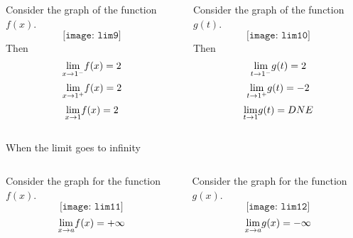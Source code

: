 \documentclass{beamer}
\begin{document}
\begin{frame}
\begin{columns}
	\begin{column}{0.48\textwidth}
		\begin{Example} Consider the graph of the function $f(x)$.
			$$
			\texttt{[image: lim9]}
			$$
			Then 
			$$
			\underset{x\rightarrow 1^-}{\rm lim}f(x)=2 $$
			$$	\underset{x\rightarrow 1^+}{\rm lim}f(x)= 2 $$ 	$$\underset{x\rightarrow 1}{\rm lim}f(x)=2
			$$
		\end{Example}
	\end{column}
	
	
	\begin{column}{0.48\textwidth}
		\begin{Example} Consider the graph of the function $g(t)$.
			$$
			\texttt{[image: lim10]}
			$$
			Then 
			$$
			\underset{t\rightarrow 1^-}{\rm lim}g(t)=2$$ 
			$$	\underset{t\rightarrow 1^+}{\rm lim}g(t)= -2$$ 
			$$	\underset{t\rightarrow 1}{\rm lim}g(t)=DNE
			$$
		\end{Example}
	\end{column}
\end{columns}
\end{frame}

\begin{frame}{When the limit goes to infinity}
\begin{columns}
	\begin{column}{.48\textwidth}
	\begin{Example}
		Consider the graph for the function $f(x)$.
		$$
		\texttt{[image: lim11]}
		$$
		$$
		\underset{x\rightarrow a}{\rm lim}f(x)=+\infty
		$$
	\end{Example}
	\end{column}
	\begin{column}{.48\textwidth}
	
	\begin{Example}
		Consider the graph for the function $g(x)$.
		$$
		\texttt{[image: lim12]}
		$$
		$$
		\underset{x\rightarrow a}{\rm lim}g(x)=-\infty
		$$
	\end{Example}
\end{column}
\end{columns}
\end{frame}
\end{document}
